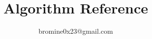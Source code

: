 \documentclass[fancyhdr,hyperref,a4paper,UTF8,leqno]{ctexbook}
\begin{document}
\title{Algorithm Reference}
\author{bromine0x23@gmail.com}
\maketitle
\tableofcontents







\end{document}
